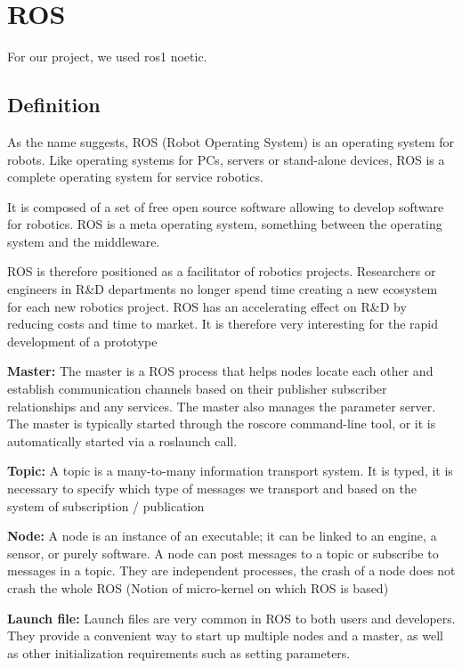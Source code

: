 \section{ROS}\insertloftspace
\setcounter{figure}{0}\setcounter{table}{0}

For our project, we used ros1 noetic.

\subsection{Definition}

\hspace{\parindent} As the name suggests, ROS (Robot Operating System) is an operating system for robots. Like operating systems for PCs, servers or stand-alone devices, ROS is a complete operating system for service robotics.

\bigbreak
It is composed of a set of free open source software allowing to develop software for robotics. ROS is a meta operating system, something between the operating system and the middleware.

\bigbreak
ROS is therefore positioned as a facilitator of robotics projects. Researchers or engineers in R\&D departments no longer spend time creating a new ecosystem for each new robotics project. ROS has an accelerating effect on R\&D by reducing costs and time to market. It is therefore very interesting for the rapid development of a prototype

\bigbreak
\textbf{Master:} The master is a ROS process that helps nodes locate each other and establish communication channels based on their publisher subscriber relationships and any services. The master also manages the parameter server. The master is typically started through the roscore command-line tool, or it is automatically started via a roslaunch call.

\bigbreak
\textbf{Topic:} A topic is a many-to-many information transport system. It is typed, it is necessary to specify which type of messages we transport and based on the system of subscription / publication 

\bigbreak
\textbf{Node:} A node is an instance of an executable; it can be linked to an engine, a sensor, or purely software. A node can post messages to a topic or subscribe to messages in a topic. They are independent processes, the crash of a node does not crash the whole ROS (Notion of micro-kernel on which ROS is based)

\bigbreak
\textbf{Launch file:} Launch files are very common in ROS to both users and developers. They provide a convenient way to start up multiple nodes and a master, as well as other initialization requirements such as setting parameters.

